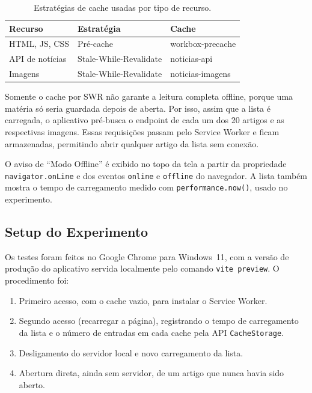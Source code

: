 \documentclass[preprint,10pt,5p]{elsarticle}
\begin{document}
\begin{table}[h]
\centering
\caption{Estratégias de cache usadas por tipo de recurso.}
\label{tab:estrategias}
\begin{tabular}{lll}
\toprule
Recurso & Estratégia & Cache \\
\midrule
HTML, JS, CSS & Pré-cache & workbox-precache \\
API de notícias & Stale-While-Revalidate & noticias-api \\
Imagens & Stale-While-Revalidate & noticias-imagens \\
\bottomrule
\end{tabular}
\end{table}

Somente o cache por SWR não garante a leitura completa offline, porque uma matéria só seria guardada depois de aberta. Por isso, assim que a lista é carregada, o aplicativo pré-busca o endpoint de cada um dos 20 artigos e as respectivas imagens. Essas requisições passam pelo Service Worker e ficam armazenadas, permitindo abrir qualquer artigo da lista sem conexão.

O aviso de ``Modo Offline'' é exibido no topo da tela a partir da propriedade \texttt{navigator.onLine} e dos eventos \texttt{online} e \texttt{offline} do navegador. A lista também mostra o tempo de carregamento medido com \texttt{performance.now()}, usado no experimento.

\subsection{Setup do Experimento}

Os testes foram feitos no Google Chrome para Windows~11, com a versão de produção do aplicativo servida localmente pelo comando \texttt{vite preview}. O procedimento foi:

\begin{enumerate}
  \item Primeiro acesso, com o cache vazio, para instalar o Service Worker.
  \item Segundo acesso (recarregar a página), registrando o tempo de carregamento da lista e o número de entradas em cada cache pela API \texttt{CacheStorage}.
  \item Desligamento do servidor local e novo carregamento da lista.
  \item Abertura direta, ainda sem servidor, de um artigo que nunca havia sido aberto.
\end{enumerate}
\end{document}
